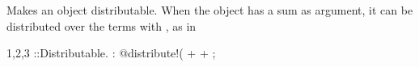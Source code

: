 
 Makes an object distributable. When
  the object has a sum as argument, it can be distributed over the
  terms with , as in
\begin{screen}{1,2,3}
\hat{#}::Distributable.
:
@distribute!(%
 +  + ;
\end{screen}
~
